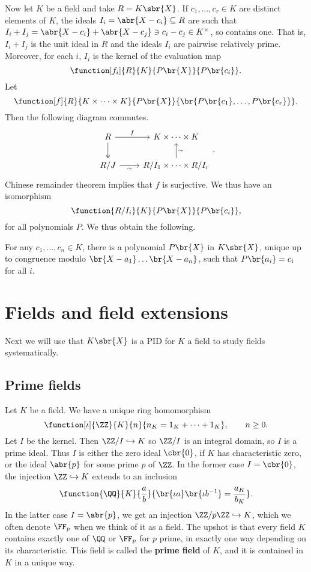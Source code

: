 Now let $ K $ be a field and take $ R = K\sbr{X} $. If $ c_1, \dots, c_r \in K $ are distinct elements of $ K $, the ideals $ I_i = \abr{X - c_i} \subseteq R $ are such that $ I_i + I_j = \abr{X - c_i} + \abr{X - c_j} \ni c_i - c_j \in K^\times $, so contains one. That is, $ I_i + I_j $ is the unit ideal in $ R $ and the ideals $ I_i $ are pairwise relatively prime. Moreover, for each $ i $, $ I_i $ is the kernel of the evaluation map
$$ \function[f_i]{R}{K}{P\br{X}}{P\br{c_i}}. $$
Let
$$ \function[f]{R}{K \times \dots \times K}{P\br{X}}{\br{P\br{c_1}, \dots, P\br{c_r}}}. $$
Then the following diagram commutes.
$$
\begin{tikzcd}
R \arrow{r}{f} \arrow[twoheadrightarrow]{d} & K \times \dots \times K \\
R / J \arrow{r}[swap]{\sim} & R / I_1 \times \dots \times R / I_r \arrow{u}[swap]{\sim}
\end{tikzcd}.
$$
Chinese remainder theorem implies that $ f $ is surjective. We thus have an isomorphism
$$ \function{R / I_i}{K}{P\br{X}}{P\br{c_i}}, $$
for all polynomials $ P $. We thus obtain the following.

\begin{theorem}
For any $ c_1, \dots, c_n \in K $, there is a polynomial $ P\br{X} $ in $ K\sbr{X} $, unique up to congruence modulo $ \br{X - a_1} \dots \br{X - a_n} $, such that $ P\br{a_i} = c_i $ for all $ i $.
\end{theorem}

\pagebreak

\section{Fields and field extensions}


Next we will use that $ K\sbr{X} $ is a PID for $ K $ a field to study fields systematically.

\subsection{Prime fields}

Let $ K $ be a field. We have a unique ring homomorphism
$$ \function[\iota]{\ZZ}{K}{n}{n_K = 1_K + \dots + 1_K}, \qquad n \ge 0. $$
Let $ I $ be the kernel. Then $ \ZZ / I \hookrightarrow K $ so $ \ZZ / I $ is an integral domain, so $ I $ is a prime ideal. Thus $ I $ is either the zero ideal $ \cbr{0} $, if $ K $ has characteristic zero, or the ideal $ \abr{p} $ for some prime $ p $ of $ \ZZ $. In the former case $ I = \cbr{0} $, the injection $ \ZZ \hookrightarrow K $ extends to an inclusion
$$ \function{\QQ}{K}{\dfrac{a}{b}}{\br{\iota a}\br{\iota b^{-1}} = \dfrac{a_K}{b_K}}. $$
In the latter case $ I = \abr{p} $, we get an injection $ \ZZ / p\ZZ \hookrightarrow K $, which we often denote $ \FF_p $ when we think of it as a field. The upshot is that every field $ K $ contains exactly one of $ \QQ $ or $ \FF_p $ for $ p $ prime, in exactly one way depending on its characteristic. This field is called the \textbf{prime field} of $ K $, and it is contained in $ K $ in a unique way.

